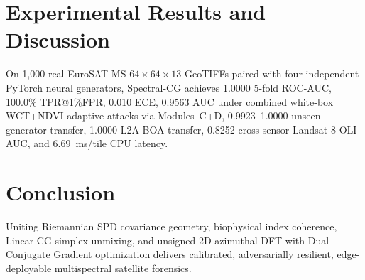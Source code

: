 \documentclass[journal]{IEEEtran}
\begin{document}
\section{Experimental Results and Discussion}
On 1,000 real EuroSAT-MS $64\times 64\times 13$ GeoTIFFs paired with four independent PyTorch neural generators, Spectral-CG achieves 1.0000 5-fold ROC-AUC, 100.0\% TPR@1\%FPR, 0.010 ECE, 0.9563 AUC under combined white-box WCT+NDVI adaptive attacks via Modules~C+D, 0.9923--1.0000 unseen-generator transfer, 1.0000 L2A BOA transfer, 0.8252 cross-sensor Landsat-8 OLI AUC, and 6.69~ms/tile CPU latency.

\section{Conclusion}
Uniting Riemannian SPD covariance geometry, biophysical index coherence, Linear CG simplex unmixing, and unsigned 2D azimuthal DFT with Dual Conjugate Gradient optimization delivers calibrated, adversarially resilient, edge-deployable multispectral satellite forensics.
\end{document}
